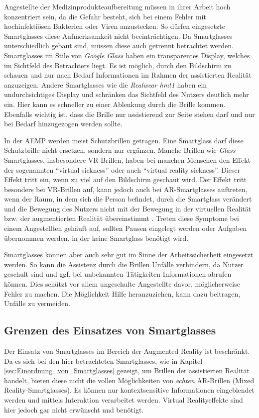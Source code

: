 Angestellte der Medizinprodukteaufbereitung müssen in ihrer Arbeit hoch konzentriert sein, da die Gefahr besteht, sich bei einem Fehler mit hochinfektiösen Bakterien oder Viren anzustecken. So dürfen eingesetzte Smartglasses diese Aufmerksamkeit nicht beeinträchtigen. Da Smartglasses unterschiedlich gebaut sind, müssen diese auch getrennt betrachtet werden. Smartglasses im Stile von \emph{Google Glass} haben ein transparentes Display, welches im Sichtfeld des Betrachters liegt. Es ist möglich, durch den Bildschirm zu schauen und nur nach Bedarf Informationen im Rahmen der assistierten Realität anzuzeigen. Andere Smartglasses wie die \emph{Realwear hmt1} haben ein undurchsichtiges Display und schränken das Sichtfeld des Nutzers deutlich mehr ein. Hier kann es schneller zu einer Ablenkung durch die Brille kommen. Ebenfalls wichtig ist, dass die Brille nur assistierend zur Seite stehen darf und nur bei Bedarf hinzugezogen werden sollte.

In der AEMP werden meist Schutzbrillen getragen. Eine Smartglass darf diese Schutzbrille nicht ersetzen, sondern nur ergänzen. Manche Brillen wie \emph{Glass} Smartglasses, insbesondere VR-Brillen, haben bei manchen Menschen den Effekt der sogenannten \enquote{virtual sickness} oder auch \enquote{virtual reality sickness}. Dieser Effekt tritt ein, wenn zu viel auf den Bildschirm geschaut wird. Der Effekt tritt besonders bei VR-Brillen auf, kann jedoch auch bei AR-Smartglasses auftreten, wenn der Raum, in dem sich die Person befindet, durch die Smartglass verändert und die Bewegung des Nutzers nicht mit der Bewegung in der virtuellen Realität bzw. der augmentierten Realität übereinstimmt \cite{Moss2011}. Treten diese Symptome bei einem Angestellten gehäuft auf, sollten Pausen eingelegt werden oder Aufgaben übernommen werden, in der keine Smartglass benötigt wird.

Smartglasses können aber auch sehr gut im Sinne der Arbeitssicherheit eingesetzt werden. So kann die Assistenz durch die Brillen Unfälle verhindern, da Nutzer geschult sind und ggf. bei unbekannten Tätigkeiten Informationen abrufen können. Dies schützt vor allem ungeschulte Angestellte davor, möglicherweise  Fehler zu machen. Die Möglichkeit Hilfe heranzuziehen, kann dazu beitragen, Unfälle zu vermeiden.
%
%
%
%
%
%
\subsection{Grenzen des Einsatzes von Smartglasses}
\label{sec:Grenzen_des_Einsatzes_von_Smartglasses}
Der Einsatz von Smartglasses im Bereich der Augmented Reality ist beschränkt. Da es sich bei den hier betrachteten Smartglasses, wie in Kapitel \ref{sec:Einordnung_von_Smartglasses} gezeigt, um Brillen der assistierten Realität handelt, bieten diese nicht die vollen Möglichkeiten von \emph{echten} AR-Brillen (Mixed Reality-Smartglasses). Es können nur kontextsensitive Informationen eingeblendet werden und mittels Interaktion verarbeitet werden. Virtual Realityeffekte sind hier jedoch gar nicht erwünscht und benötigt.

